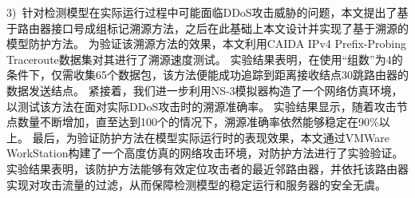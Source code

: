 \begin{cabstract}
3)~针对检测模型在实际运行过程中可能面临DDoS攻击威胁的问题，本文提出了基于路由器接口号成组标记溯源方法，之后在此基础上本文设计并实现了基于溯源的模型防护方法。
为验证该溯源方法的效果，本文利用CAIDA IPv4 Prefix-Probing Traceroute数据集对其进行了溯源速度测试。
实验结果表明，在使用“组数”为4的条件下，仅需收集65个数据包，该方法便能成功追踪到距离接收结点30跳路由器的数据发送结点。
紧接着，我们进一步利用NS-3模拟器构造了一个网络仿真环境，以测试该方法在面对实际DDoS攻击时的溯源准确率。
实验结果显示，随着攻击节点数量不断增加，直至达到100个的情况下，溯源准确率依然能够稳定在90\%以上。
最后，为验证防护方法在模型实际运行时的表现效果，本文通过VMWare WorkStation构建了一个高度仿真的网络攻击环境，对防护方法进行了实验验证。
实验结果表明，该防护方法能够有效定位攻击者的最近邻路由器，并依托该路由器实现对攻击流量的过滤，从而保障检测模型的稳定运行和服务器的安全无虞。
\end{cabstract}


